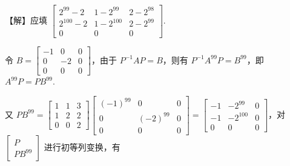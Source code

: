 【解】应填 $\begin{bmatrix}2^{99}-2&1-2^{99}&2-2^{98}\\2^{100}-2&1-2^{100}&2-2^{99}\\0&0&0\end{bmatrix}$.

令 $B=\begin{bmatrix}-1&0&0\\0&-2&0\\0&0&0\end{bmatrix}$，由于 $P^{-1}AP=B$，则有 $P^{-1}A^{99}P=B^{99}$，即 $A^{99}P=PB^{99}$.

又 $PB^{99}=\begin{bmatrix}1&1&3\\1&2&2\\0&0&2\end{bmatrix}\begin{bmatrix}(-1)^{99}&0&0\\0&(-2)^{99}&0\\0&0&0\end{bmatrix}=\begin{bmatrix}-1&-2^{99}&0\\-1&-2^{100}&0\\0&0&0\end{bmatrix}$，对 $\begin{bmatrix}P\\PB^{99}\end{bmatrix}$ 进行初等列变换，有



